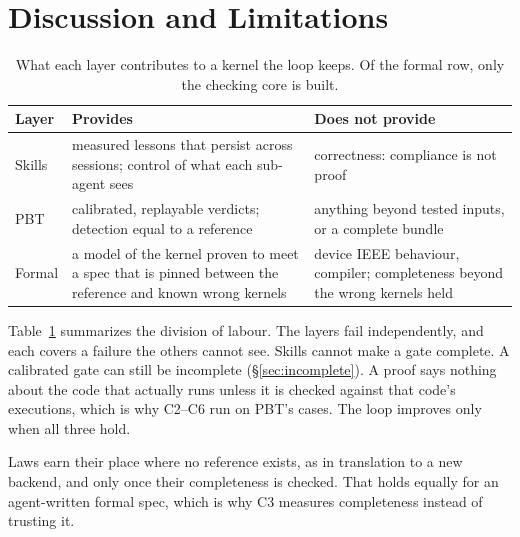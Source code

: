 \section{Discussion and Limitations}
\label{sec:discussion}

\begin{table}[t]
\centering
\small
\setlength{\tabcolsep}{3pt}
\begin{tabular}{@{}p{}p{}p{}@{}}
\toprule
Layer & Provides & Does not provide \\
\midrule
Skills & measured lessons that persist across sessions; control of what each sub-agent sees
       & correctness: compliance is not proof \\
PBT    & calibrated, replayable verdicts; detection equal to a reference
       & anything beyond tested inputs, or a complete bundle \\
Formal & a model of the kernel proven to meet a spec that is pinned between the reference and known wrong kernels
       & device IEEE behaviour, compiler; completeness beyond the wrong kernels held \\
\bottomrule
\end{tabular}
\caption{What each layer contributes to a kernel the loop keeps. Of the formal row,
  only the checking core is built.}
\label{tab:layers}
\end{table}

Table~\ref{tab:layers} summarizes the division of labour. The layers fail independently,
and each covers a failure the others cannot see. Skills cannot make a gate complete. A
calibrated gate can still be incomplete (\S\ref{sec:incomplete}). A proof says nothing
about the code that actually runs unless it is checked against that code's executions,
which is why C2--C6 run on PBT's cases. The loop improves only when all three hold.

Laws earn their place where no reference exists, as in translation to a new backend,
and only once their completeness is checked. That holds equally for an agent-written
formal spec, which is why C3 measures completeness instead of trusting it.

